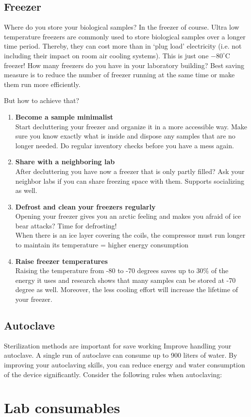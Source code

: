 \subsection{Freezer }
Where do you store your biological samples? In the freezer of course. 
Ultra low temperature freezers are commonly used to store biological samples over a longer time period. Thereby, they can cost more than  in ‘plug load’ electricity (i.e. not including their impact on room air cooling systems). This is just one $-80^\circ \text{C}$ freezer!
How many freezers do you have in your laboratory building? 
Best saving measure is to reduce the number of freezer running at the same time or make them run more efficiently. 

But how to achieve that?  

\begin{enumerate}
	\item \textbf{Become a sample minimalist}\\
	Start decluttering your freezer and organize it in a more accessible way. Make sure you know exactly what is inside and dispose any samples that are no longer needed. Do regular inventory checks before you have a mess again. 
	
	\item \textbf{Share with a neighboring lab}\\
	After decluttering you have now a freezer that is only partly filled? Ask your neighbor labs if you can share freezing space with them. Supports socializing as well.
	
	\item \textbf{Defrost and clean your freezers regularly}\\
	Opening your freezer gives you an arctic feeling and makes you afraid of ice bear attacks? Time for defrosting!\\ 
	When there is an ice layer covering the coils, the compressor must run longer to maintain its temperature = higher energy consumption
	
	\item \textbf{Raise freezer temperatures}\\
	Raising the temperature from -80 to -70 degrees saves up to 30\% of the energy it uses and research shows that many samples can be stored at -70 degree as well. Moreover, the less cooling effort will increase the lifetime of your freezer. 
	
\end{enumerate}

\subsection{Autoclave} 
Sterilization methods are important for save working Improve handling your autoclave. A single run of autoclave can consume up to 900 liters of water. By improving your autoclaving skills, you can reduce energy and water consumption of the device significantly. 
Consider the following rules when autoclaving: 

\section{Lab consumables}
